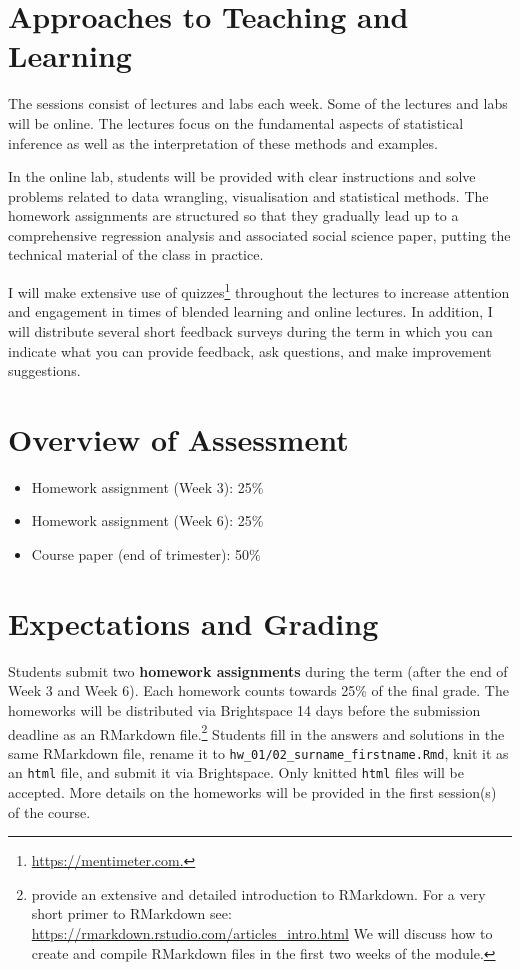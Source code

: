 \documentclass[abstract=on,parskip=full,headings=standardclasses,fontsize=11pt,paper=a4]{scrartcl}
\begin{document}
\section*{Approaches to Teaching and Learning}

The sessions consist of lectures and labs each week. Some of the lectures and labs will be online. The lectures focus on the fundamental aspects of statistical inference as well as the interpretation of these methods and examples. %

In the online lab, students will be provided with clear instructions and solve problems related to data wrangling, visualisation and statistical methods. The homework assignments are structured so that they gradually lead up to a comprehensive regression analysis and associated social science paper, putting the technical material of the class in practice.

I will make extensive use of quizzes\footnote{\url{https://mentimeter.com.}} throughout the lectures to increase attention and engagement in times of blended learning and online lectures. In addition, I will distribute several short feedback surveys during the term in which you can indicate what you can provide feedback, ask questions, and make improvement suggestions. 

\section*{Overview of Assessment}

\begin{itemize}
\item Homework assignment (Week 3): 25\% 
\item Homework assignment  (Week 6): 25\% 
\item Course paper (end of trimester): 50\%
\end{itemize}


\section*{Expectations and Grading}


Students submit two \textbf{homework assignments} during the term (after the end of Week 3 and Week 6). Each homework counts towards 25\% of the final grade.  The homeworks will be distributed via Brightspace 14 days before the submission deadline as an RMarkdown file.\footnote{\textcite{xie18} provide an extensive and detailed introduction to RMarkdown. For a very short primer to RMarkdown see: \url{https://rmarkdown.rstudio.com/articles_intro.html} We will discuss how to create and compile RMarkdown files in the first two weeks of the module.} Students fill in the answers and solutions in the same RMarkdown file, rename it to \texttt{hw\_01/02\_surname\_firstname.Rmd}, knit it as an \texttt{html} file, and submit it via Brightspace. Only knitted \texttt{html} files will be accepted. More details on the homeworks will be provided in the first session(s) of the course.
\end{document}
